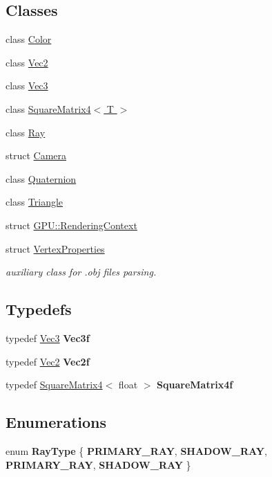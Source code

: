 \subsection*{Classes}
\begin{DoxyCompactItemize}
\item 
class \hyperlink{class_color}{Color}
\item 
class \hyperlink{class_vec2}{Vec2}
\item 
class \hyperlink{class_vec3}{Vec3}
\item 
class \hyperlink{class_square_matrix4}{Square\+Matrix4$<$ T $>$}
\item 
class \hyperlink{class_ray}{Ray}
\item 
struct \hyperlink{struct_camera}{Camera}
\item 
class \hyperlink{class_quaternion}{Quaternion}
\item 
class \hyperlink{class_triangle}{Triangle}
\item 
struct \hyperlink{struct_g_p_u_1_1_rendering_context}{G\+P\+U\+::\+Rendering\+Context}
\item 
struct \hyperlink{struct_vertex_properties}{Vertex\+Properties}
\begin{DoxyCompactList}\small\item\em auxiliary class for .obj files parsing. \end{DoxyCompactList}\end{DoxyCompactItemize}
\subsection*{Typedefs}
\begin{DoxyCompactItemize}
\item 
typedef \hyperlink{class_vec3}{Vec3} {\bfseries Vec3f}
\item 
typedef \hyperlink{class_vec2}{Vec2} {\bfseries Vec2f}
\item 
typedef \hyperlink{class_square_matrix4}{Square\+Matrix4}$<$ float $>$ {\bfseries Square\+Matrix4f}
\end{DoxyCompactItemize}
\subsection*{Enumerations}
\begin{DoxyCompactItemize}
\item 
enum {\bfseries Ray\+Type} \{ {\bfseries P\+R\+I\+M\+A\+R\+Y\+\_\+\+R\+AY}, 
{\bfseries S\+H\+A\+D\+O\+W\+\_\+\+R\+AY}, 
{\bfseries P\+R\+I\+M\+A\+R\+Y\+\_\+\+R\+AY}, 
{\bfseries S\+H\+A\+D\+O\+W\+\_\+\+R\+AY}
 \}\hypertarget{group__linear__algebra_ga1d5111b9fffd76014406e866c8784459}{}\label{group__linear__algebra_ga1d5111b9fffd76014406e866c8784459}

\end{DoxyCompactItemize}
